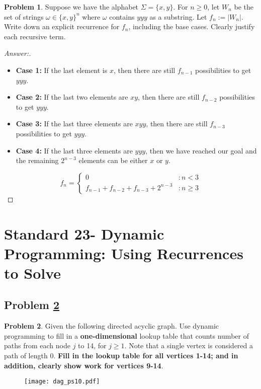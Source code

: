 \documentclass[11pt]{article}
\theoremstyle{definition}
\theoremstyle{definition}
\newtheorem{required}{Problem}
\theoremstyle{definition}
\begin{document}
\begin{required} \label{DP4}
Suppose we have the alphabet $\Sigma = \{x, y\}$. For $n \geq 0$, let $W_{n}$ be the set of strings $\omega \in \{x, y\}^{n}$ where $\omega$ contains $yyy$ as a substring. Let $f_{n} := |W_{n}|$. Write down an explicit recurrence for $f_{n}$, including the base cases. Clearly justify each recursive term.
\end{required}

\begin{proof}[Answer:] \
\begin{itemize}
\item \textbf{Case 1:} If the last element is $x$, then there are still $f_{n-1}$ possibilities to get $yyy$.
\item \textbf{Case 2:} If the last two elements are $xy$, then there are still $f_{n-2}$ possibilities to get $yyy$.
\item \textbf{Case 3:} If the last three elements are $xyy$, then there are still $f_{n-3}$ possibilities to get $yyy$.
\item \textbf{Case 4:} If the last three elements are $yyy$, then we have reached our goal and the remaining $2^{n-3}$ elements can be either $x$ or $y$.
\end{itemize}
\[
f_n = \begin{cases} 
0 & : n < 3 \\
f_{n-1} + f_{n-2} + f_{n-3} + 2^{n-3} & : n \geq 3
\end{cases}
\]
\end{proof}




\newpage
\section{Standard 23- Dynamic Programming: Using Recurrences to Solve}

\subsection{Problem \ref{Recurrence1}}
\begin{required} \label{Recurrence1}
Given the following directed acyclic graph. Use dynamic programming to fill in a \textbf{one-dimensional} lookup table that counts number of paths from each node $j$ to 14, for $j \geq 1$. Note that a single vertex is considered a path of length $0$. \textbf{Fill in the lookup table for all vertices 1-14; and in addition, clearly show work for vertices 9-14}.

        \begin{figure}[h!]
        \begin{center}
        \texttt{[image: dag\_ps10.pdf]} 
        \end{center}
        \end{figure}

\end{required}
\end{document}
